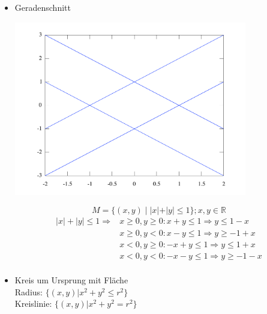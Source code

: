 \begin{itemize}

  \item Geradenschnitt

    \begin{center}
      \includegraphics[width=0.8\textwidth]{include/geo_betraege.pdf}
    \end{center}

    \begin{equation*}
    M = \{(x,y)\;|\; |x|+|y| \leq 1 \}; x,y \in \mathbb{R}
    \end{equation*}
    \begin{align*}
    |x|+|y| \leq 1 \Rightarrow &x \geq 0, y \geq 0: x+y \leq 1 \Rightarrow y \leq 1-x \\
            &x \geq 0, y < 0: x-y \leq 1 \Rightarrow y \geq -1+x \\
            &x < 0, y \geq 0: -x+y \leq 1 \Rightarrow y \leq 1+x \\
            &x < 0, y < 0: -x-y \leq 1 \Rightarrow y \geq -1-x \\
    \end{align*}
  
  \item
    Kreis um Ursprung mit Fläche\\
    Radius: $\{(x,y)| x^2+y^2\leq r^2 \}$\\
    Kreislinie: $\{(x,y)| x^2+y^2 = r^2 \}$
\end{itemize}
